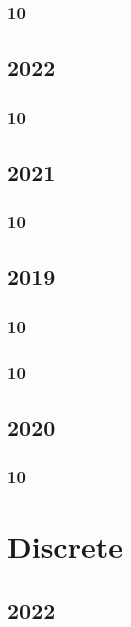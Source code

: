\documentclass[11pt]{book}
\begin{document}
\subsection{10}


\section{2022}
\subsection{10}


\section{2021}
\subsection{10}

\section{2019}
\subsection{10}

\subsection{10}




\section{2020}
\subsection{10}


%
%
%

\chapter{Discrete}
\section{2022}
\end{document}
